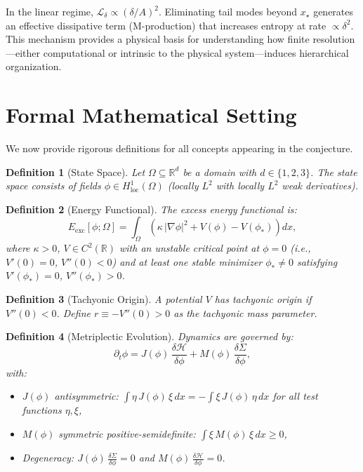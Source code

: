 \documentclass{article}
\newtheorem{definition}{Definition}
\begin{document}
In the linear regime, $\mathcal{L}_\delta \propto (\delta/A)^2$. Eliminating tail modes beyond $x_\star$ generates an effective dissipative term (M-production) that increases entropy at rate $\propto \delta^2$. This mechanism provides a physical basis for understanding how finite resolution---either computational or intrinsic to the physical system---induces hierarchical organization.

\section{Formal Mathematical Setting}
\label{sec:formal}

We now provide rigorous definitions for all concepts appearing in the conjecture.

\begin{definition}[State Space]
Let $\Omega \subseteq \mathbb{R}^d$ be a domain with $d \in \{1,2,3\}$. The state space consists of fields $\phi \in H^1_{\text{loc}}(\Omega)$ (locally $L^2$ with locally $L^2$ weak derivatives).
\end{definition}

\begin{definition}[Energy Functional]
The excess energy functional is:
\begin{equation}
E_{\text{exc}}[\phi; \Omega] = \int_{\Omega} \left( \kappa\,|\nabla\phi|^2 + V(\phi) - V(\phi_\ast) \right) dx,
\end{equation}
where $\kappa > 0$, $V \in C^2(\mathbb{R})$ with an unstable critical point at $\phi = 0$ (i.e., $V'(0) = 0$, $V''(0) < 0$) and at least one stable minimizer $\phi_\ast \neq 0$ satisfying $V'(\phi_\ast) = 0$, $V''(\phi_\ast) > 0$.
\end{definition}

\begin{definition}[Tachyonic Origin]
A potential $V$ has \emph{tachyonic origin} if $V''(0) < 0$. Define $r \equiv -V''(0) > 0$ as the tachyonic mass parameter.
\end{definition}

\begin{definition}[Metriplectic Evolution]
Dynamics are governed by:
\begin{equation}
\partial_t \phi = J(\phi)\,\frac{\delta \mathcal{H}}{\delta \phi} + M(\phi)\,\frac{\delta \Sigma}{\delta \phi},
\end{equation}
with:
\begin{itemize}[noitemsep]
\item $J(\phi)$ antisymmetric: $\int \eta\, J(\phi)\,\xi\, dx = -\int \xi\, J(\phi)\,\eta\, dx$ for all test functions $\eta, \xi$,
\item $M(\phi)$ symmetric positive-semidefinite: $\int \xi\, M(\phi)\,\xi\, dx \geq 0$,
\item Degeneracy: $J(\phi)\,\frac{\delta\Sigma}{\delta\phi} = 0$ and $M(\phi)\,\frac{\delta\mathcal{H}}{\delta\phi} = 0$.
\end{itemize}
\end{definition}
\end{document}
